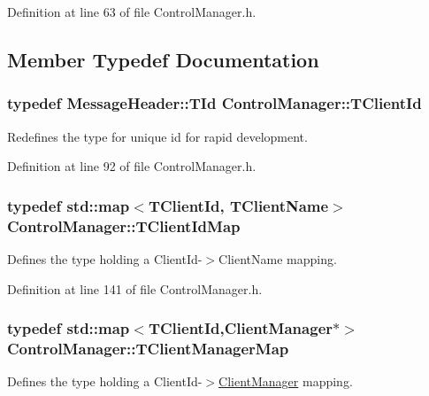 Definition at line 63 of file Control\-Manager.\-h.



\subsection{Member Typedef Documentation}
\hypertarget{class_control_manager_a1bff13cab35db39c43f81f49b56e4849}{
\subsubsection[{T\-Client\-Id}]{\setlength{\rightskip}{0pt plus 5cm}typedef {\bf Message\-Header\-::\-T\-Id} {\bf Control\-Manager\-::\-T\-Client\-Id}}}\label{class_control_manager_a1bff13cab35db39c43f81f49b56e4849}
Redefines the type for unique id for rapid development. 

Definition at line 92 of file Control\-Manager.\-h.

\hypertarget{class_control_manager_a5f6aa6ca619f6aa8dddfc3d5000162f0}{
\subsubsection[{T\-Client\-Id\-Map}]{\setlength{\rightskip}{0pt plus 5cm}typedef std\-::map$<${\bf T\-Client\-Id}, {\bf T\-Client\-Name}$>$ {\bf Control\-Manager\-::\-T\-Client\-Id\-Map}\hspace{0.3cm}{\ttfamily [private]}}}\label{class_control_manager_a5f6aa6ca619f6aa8dddfc3d5000162f0}
Defines the type holding a Client\-Id-\/$>$Client\-Name mapping. 

Definition at line 141 of file Control\-Manager.\-h.

\hypertarget{class_control_manager_a27b18022695359e2a4d5563f91b6befd}{
\subsubsection[{T\-Client\-Manager\-Map}]{\setlength{\rightskip}{0pt plus 5cm}typedef std\-::map$<${\bf T\-Client\-Id},{\bf Client\-Manager}$\ast$$>$ {\bf Control\-Manager\-::\-T\-Client\-Manager\-Map}\hspace{0.3cm}{\ttfamily [private]}}}\label{class_control_manager_a27b18022695359e2a4d5563f91b6befd}
Defines the type holding a Client\-Id-\/$>$\hyperlink{class_client_manager}{Client\-Manager} mapping. 


